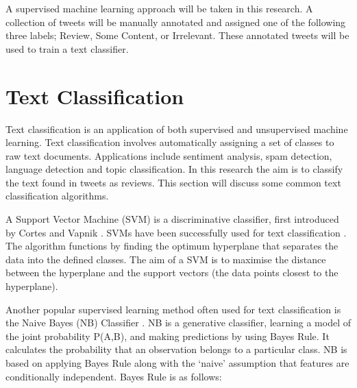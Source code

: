 A supervised machine learning approach will be taken in this research. A collection of tweets will be manually annotated and assigned one of the following three labels; Review, Some Content, or Irrelevant. These annotated tweets will be used to train a text classifier. 

\section{Text Classification}

Text classification \cite{khan2010} is an application of both supervised and unsupervised machine learning. Text classification involves automatically assigning a set of classes to raw text documents. Applications include sentiment analysis, spam detection, language detection and topic classification. In this research the aim is to classify the text found in tweets as reviews. This section will discuss some common text classification algorithms.



A Support Vector Machine (SVM) is a discriminative classifier, first introduced by Cortes and Vapnik \cite{Vapnik1995,  Vapnik21995}. SVMs have been successfully used for text classification \cite{Joachims1998, tong2001support}. The algorithm functions by finding the optimum hyperplane that separates the data into the defined classes. The aim of a SVM is to maximise the distance between the hyperplane and the support vectors (the data points closest to the hyperplane). 

Another popular supervised learning method often used for text classification is the Naive Bayes (NB) Classifier  \cite{NaiveBayes1998}. NB is a generative classifier, learning a model of the joint probability P(A,B), and making predictions by using Bayes Rule. It calculates the probability that an observation belongs to a particular class. NB is based on applying Bayes Rule along with the ‘naive’ assumption that features are conditionally independent. Bayes Rule is as follows:

